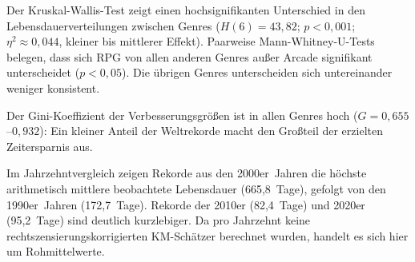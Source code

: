 Der Kruskal-Wallis-Test zeigt einen hochsignifikanten Unterschied in den Lebensdauerverteilungen zwischen Genres ($H(6) = 43{,}82$; $p < 0{,}001$; $\eta^2 \approx 0{,}044$, kleiner bis mittlerer Effekt). Paarweise Mann-Whitney-U-Tests belegen, dass sich RPG von allen anderen Genres außer Arcade signifikant unterscheidet ($p < 0{,}05$). Die übrigen Genres unterscheiden sich untereinander weniger konsistent.

Der Gini-Koeffizient der Verbesserungsgrößen ist in allen Genres hoch ($G = 0{,}655$–$0{,}932$): Ein kleiner Anteil der Weltrekorde macht den Großteil der erzielten Zeitersparnis aus.

Im Jahrzehntvergleich zeigen Rekorde aus den 2000er~Jahren die höchste arithmetisch mittlere beobachtete Lebensdauer (665,8~Tage), gefolgt von den 1990er~Jahren (172,7~Tage). Rekorde der 2010er (82,4~Tage) und 2020er (95,2~Tage) sind deutlich kurzlebiger. Da pro Jahrzehnt keine rechtszensierungskorrigierten KM-Schätzer berechnet wurden, handelt es sich hier um Rohmittelwerte.



